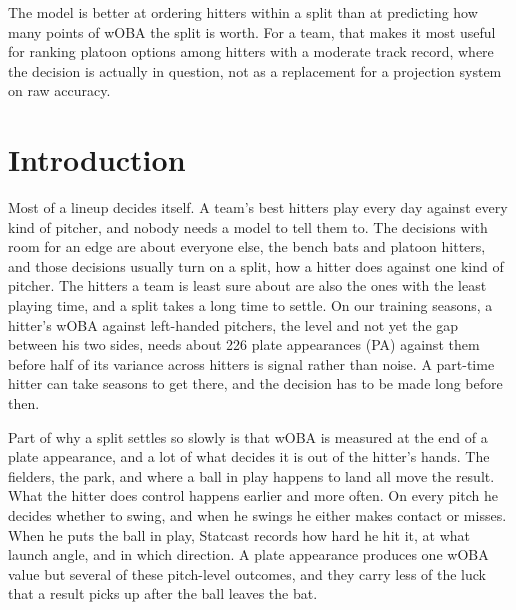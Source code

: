 \documentclass[11pt,letterpaper]{article}
\begin{document}
The model is better at ordering hitters within a split than at predicting how many points of wOBA the split is worth. For a team, that makes it most useful for ranking platoon options among hitters with a moderate track record, where the decision is actually in question, not as a replacement for a projection system on raw accuracy.

\section{Introduction}
\label{sec:intro}

Most of a lineup decides itself. A team's best hitters play every day against every kind of pitcher, and nobody needs a model to tell them to. The decisions with room for an edge are about everyone else, the bench bats and platoon hitters, and those decisions usually turn on a split, how a hitter does against one kind of pitcher. The hitters a team is least sure about are also the ones with the least playing time, and a split takes a long time to settle. On our training seasons, a hitter's wOBA against left-handed pitchers, the level and not yet the gap between his two sides, needs about 226 plate appearances (PA) against them before half of its variance across hitters is signal rather than noise. A part-time hitter can take seasons to get there, and the decision has to be made long before then.

Part of why a split settles so slowly is that wOBA is measured at the end of a plate appearance, and a lot of what decides it is out of the hitter's hands. The fielders, the park, and where a ball in play happens to land all move the result. What the hitter does control happens earlier and more often. On every pitch he decides whether to swing, and when he swings he either makes contact or misses. When he puts the ball in play, Statcast records how hard he hit it, at what launch angle, and in which direction. A plate appearance produces one wOBA value but several of these pitch-level outcomes, and they carry less of the luck that a result picks up after the ball leaves the bat.
\end{document}
